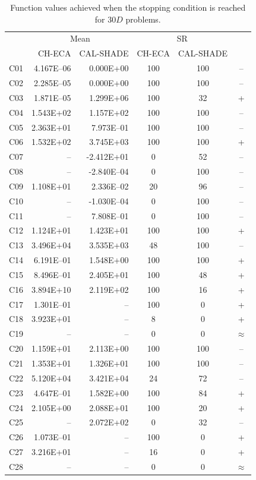 \documentclass[conference]{IEEEtran}
\begin{document}
% 
% 
% 
\begin{table}[!ht]
	\caption{Function values achieved when the stopping condition is reached for $30D$ problems.}
	\centering
	\begin{tabular}{|c|r|r|c|c|c|}
	 \hline
	 &\multicolumn{2}{|c|}{Mean} & \multicolumn{2}{|c|}{SR} & \\
	\cline{2-5}
	 & CH-ECA & CAL-SHADE & CH-ECA & CAL-SHADE & \\ \hline

C01 & 4.167E--06 & 0.000E+00 &  100 &  100 & -- \\ 
C02 & 2.285E--05 & 0.000E+00 &  100 &  100 & -- \\ 
C03 & 1.871E--05 & 1.299E+06 &  100 &   32 & + \\ 
C04 & 1.543E+02 & 1.157E+02 &  100 &  100 & -- \\ 
C05 & 2.363E+01 & 7.973E--01 &  100 &  100 & -- \\ 
C06 & 1.532E+02 & 3.745E+03 &  100 &  100 & + \\ 
C07 &  -- & -2.412E+01 &    0 &   52 & -- \\ 
C08 &  -- & -2.840E--04 &    0 &  100 & -- \\ 
C09 & 1.108E+01 & 2.336E--02 &   20 &   96 & -- \\ 
C10 &  -- & -1.030E--04 &    0 &  100 & -- \\ 
C11 &  -- & 7.808E--01 &    0 &  100 & -- \\ 
C12 & 1.124E+01 & 1.423E+01 &  100 &  100 & + \\ 
C13 & 3.496E+04 & 3.535E+03 &   48 &  100 & -- \\ 
C14 & 6.191E--01 & 1.548E+00 &  100 &  100 & + \\ 
C15 & 8.496E--01 & 2.405E+01 &  100 &   48 & + \\ 
C16 & 3.894E+10 & 2.119E+02 &  100 &   16 & + \\ 
C17 & 1.301E--01 &  -- &  100 &    0 & + \\ 
C18 & 3.923E+01 &  -- &    8 &    0 & + \\ 
C19 &  -- &  -- &    0 &    0 & $\approx$ \\ 
C20 & 1.159E+01 & 2.113E+00 &  100 &  100 & -- \\ 
C21 & 1.353E+01 & 1.326E+01 &  100 &  100 & -- \\ 
C22 & 5.120E+04 & 3.421E+04 &   24 &   72 & -- \\ 
C23 & 4.647E--01 & 1.582E+00 &  100 &   84 & + \\ 
C24 & 2.105E+00 & 2.088E+01 &  100 &   20 & + \\ 
C25 &  -- & 2.072E+02 &    0 &   32 & -- \\ 
C26 & 1.073E--01 &  -- &  100 &    0 & + \\ 
C27 & 3.216E+01 &  -- &   16 &    0 & + \\ 
C28 &  -- &  -- &    0 &    0 & $\approx$ \\ 
   \hline
	\end{tabular}
	\label{tab:d30c}
\end{table}
\end{document}

